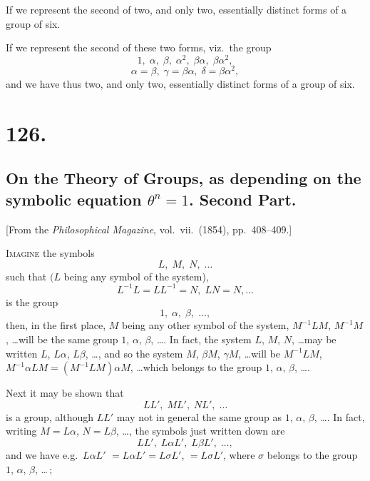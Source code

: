 \documentclass[11pt,a4paper]{book}
\begin{document}
If we represent the second of two, and only two, essentially distinct forms of a group of six.

\medskip

If we represent the second of these two forms, viz.\ the group
\[
1,\;\alpha,\;\beta,\;\alpha^2,\;\beta\alpha,\;\beta\alpha^2,
\]
\[
\alpha = \beta,\;\gamma = \beta\alpha,\;\delta = \beta\alpha^2,
\]
\noindent and we have thus two, and only two, essentially distinct forms of a group of six.

\medskip

\medskip

\section*{126.}
\subsection*{On the Theory of Groups, as depending on the symbolic equation $\theta^n=1$. Second Part.}

[From the \textit{Philosophical Magazine}, vol.\ vii.\ (1854), pp.\ 408--409.]

\medskip

\noindent\textsc{Imagine} the symbols
\[
L,\;M,\;N,\;\ldots
\]
such that $(L$ being any symbol of the system),
\[
L^{-1}L = LL^{-1} = N,\;LN = N,\ldots
\]
is the group
\[
1,\;\alpha,\;\beta,\;\ldots,
\]
then, in the first place, $M$ being any other symbol of the system, $M^{-1}LM$,
$M^{-1}M$, \ldots will be the same group $1$, $\alpha$, $\beta$, \ldots. In fact, the system $L$, $M$, $N$, \ldots may be
written $L$, $L\alpha$, $L\beta$, \ldots, and so the system $M$, $\beta M$, $\gamma M$, \ldots will be $M^{-1}LM$,
$M^{-1}\alpha LM = (M^{-1}LM)\alpha M$, \ldots which belongs to the group $1$, $\alpha$, $\beta$, \ldots.

\medskip

Next it may be shown that
\[
LL',\;ML',\;NL',\;\ldots
\]
is a group, although $LL'$ may not in general the same group as $1$, $\alpha$, $\beta$, \ldots. In fact, writing
$M = L\alpha$, $N = L\beta$, \ldots, the symbols just written down are
\[
LL',\;L\alpha L',\;L\beta L',\;\ldots,
\]
and we have e.g.\ $L\alpha L'$ $= L\alpha L' = L\sigma L'$, $= L\sigma L'$, where $\sigma$ belongs to the group $1$, $\alpha$, $\beta$, \ldots\,;
\end{document}
